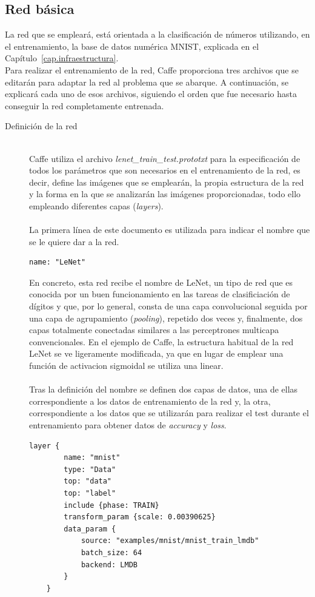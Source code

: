 \subsection{Red básica}
La red que se empleará, está orientada a la clasificación de números utilizando, en el entrenamiento, la base de datos numérica MNIST, explicada en el Capítulo~\ref{cap.infraestructura}.\\
Para realizar el entrenamiento de la red, Caffe proporciona tres archivos que se editarán para adaptar la red al problema que se abarque. A continuación, se explicará cada uno de esos archivos, siguiendo el orden que fue necesario hasta conseguir la red completamente entrenada.
\vspace{15pt}
\begin{description}
	\item[Definición de la red] \hfill 
	\vspace{10pt}
	\\
	Caffe utiliza el archivo 
	\textit{lenet\_train\_test.prototxt} para la especificación de todos los parámetros que son necesarios en el entrenamiento de la red, es decir, define las imágenes que se emplearán, la propia estructura de la red y la forma en la que se analizarán las imágenes proporcionadas, todo ello empleando diferentes capas (\textit{layers}).\\
	\vspace{-10pt}
	\\
	La primera línea de este documento es utilizada para indicar el nombre que se le quiere dar a la red.
	\vspace{10pt}
	\begin{lstlisting}[frame=single]
	name: "LeNet"
	\end{lstlisting}
	
	En concreto, esta red recibe el nombre de LeNet, un tipo de red que es conocida por un buen funcionamiento en las tareas de clasificiación de dígitos y que, por lo general, consta de una capa convolucional seguida por una capa de agrupamiento (\textit{pooling}), repetido dos veces y, finalmente, dos capas totalmente conectadas similares a las perceptrones multicapa convencionales. En el ejemplo de Caffe, la estructura habitual de la red LeNet se ve ligeramente modificada, ya que en lugar de emplear una función de activacion sigmoidal se utiliza una linear.\\
	\vspace{-10pt}
	\\
	Tras la definición del nombre se definen dos capas de datos, una de ellas correspondiente a los datos de entrenamiento de la red y, la otra, correspondiente a los datos que se utilizarán para realizar el test durante el entrenamiento para obtener datos de \textit{accuracy} y \textit{loss}.
	\vspace{10pt}
	\begin{lstlisting}[frame=single]
	layer {
		name: "mnist"
		type: "Data"
		top: "data"
		top: "label"
		include {phase: TRAIN}
		transform_param {scale: 0.00390625}
		data_param {
			source: "examples/mnist/mnist_train_lmdb"
			batch_size: 64
			backend: LMDB
		}
	}
	\end{lstlisting}
	

\end{description}
